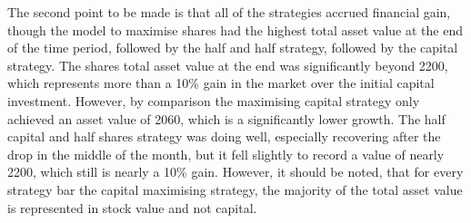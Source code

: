 The second point to be made is that all of the strategies accrued financial gain, though the model to maximise shares had the highest total asset value at the end of the time period, followed by the half and half strategy, followed by the capital strategy. The shares total asset value at the end was significantly beyond 2200, which represents more than a 10\% gain in the market over the initial capital investment. However, by comparison the maximising capital strategy only achieved an asset value of 2060, which is a significantly lower growth. The half capital and half shares strategy was doing well, especially recovering after the drop in the middle of the month, but it fell slightly to record a value of nearly 2200, which still is nearly a 10\% gain. However, it should be noted, that for every strategy bar the capital maximising strategy, the majority of the total asset value is represented in stock value and not capital.

